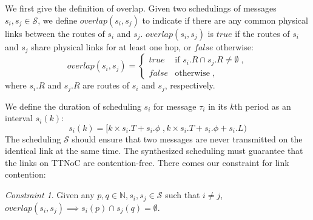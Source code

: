\documentclass[journal]{IEEEtran}
\newcommand{\calS}{\mathcal{S}}
\theoremstyle{remark}
\newtheorem{constraint}{Constraint}
\begin{document}
We first give the definition of overlap.
Given two schedulings of messages $s_i,s_j\in\calS$, %
 we define $overlap(s_i,s_j)$ to indicate if there are any common physical links between the routes of $s_i$ and $s_j$.
$overlap(s_i,s_j)$ is $true$ if the routes of $s_i$ and $s_j$ share
physical links for at least one hop, or $false$ otherwise:
\begin{equation}
\label{e:overlap}
overlap(s_i,s_j)= 
\begin{cases}
  true &\mbox{if } s_i.R \cap s_j.R \neq \emptyset \; ,\\
  false & \mbox{otherwise}\; ,
\end{cases}
\end{equation}
where $s_i.R$ and $s_j.R$ are routes of $s_i$ and $s_j$, respectively.

We define the duration of scheduling $s_i$ for message $\tau_i$ in its $k$th
period as an interval $s_i(k)$:
\begin{equation}
\label{e:duration}
s_i(k) = [k\times s_i.T+s_i.\phi \; , k\times s_i.T+s_i.\phi+s_i.L)
\end{equation}  
The scheduling $\calS$ should ensure that two messages are never transmitted on the identical link at the same
time. 
The synthesized scheduling must guarantee that the links on TTNoC are contention-free.
There comes our constraint for link contention:
\begin{constraint}
\label{c:link}
  Given any $p,q\in\mathbb{N}, s_i,s_j \in \calS$ such that $i\neq j$, 
  $overlap(s_i,s_j) \implies s_i(p) \cap s_j(q) = \emptyset$.


  
\end{constraint}
\end{document}
